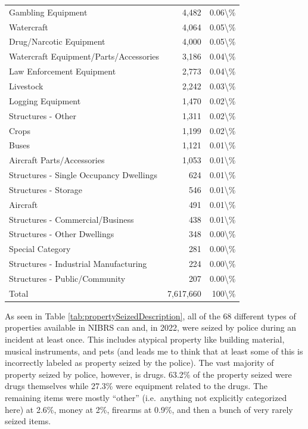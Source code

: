 \documentclass[
  12pt,
  openany]{book}
\begin{document}
\begin{longtable}[t]{lrr}
Gambling Equipment & 4,482 & 0.06\textbackslash{}\%\\
\addlinespace
Watercraft & 4,064 & 0.05\textbackslash{}\%\\
Drug/Narcotic Equipment & 4,000 & 0.05\textbackslash{}\%\\
Watercraft Equipment/Parts/Accessories & 3,186 & 0.04\textbackslash{}\%\\
Law Enforcement Equipment & 2,773 & 0.04\textbackslash{}\%\\
Livestock & 2,242 & 0.03\textbackslash{}\%\\
\addlinespace
Logging Equipment & 1,470 & 0.02\textbackslash{}\%\\
Structures - Other & 1,311 & 0.02\textbackslash{}\%\\
Crops & 1,199 & 0.02\textbackslash{}\%\\
Buses & 1,121 & 0.01\textbackslash{}\%\\
Aircraft Parts/Accessories & 1,053 & 0.01\textbackslash{}\%\\
\addlinespace
Structures - Single Occupancy Dwellings & 624 & 0.01\textbackslash{}\%\\
Structures - Storage & 546 & 0.01\textbackslash{}\%\\
Aircraft & 491 & 0.01\textbackslash{}\%\\
Structures - Commercial/Business & 438 & 0.01\textbackslash{}\%\\
Structures - Other Dwellings & 348 & 0.00\textbackslash{}\%\\
\addlinespace
Special Category & 281 & 0.00\textbackslash{}\%\\
Structures - Industrial Manufacturing & 224 & 0.00\textbackslash{}\%\\
Structures - Public/Community & 207 & 0.00\textbackslash{}\%\\
Total & 7,617,660 & 100\textbackslash{}\%\\
\bottomrule
\end{longtable}

As seen in Table \ref{tab:propertySeizedDescription}, all of the 68 different types of properties available in NIBRS can and, in 2022, were seized by police during an incident at least once. This includes atypical property like building material, musical instruments, and pets (and leads me to think that at least some of this is incorrectly labeled as property seized by the police). The vast majority of property seized by police, however, is drugs. 63.2\% of the property seized were drugs themselves while 27.3\% were equipment related to the drugs. The remaining items were mostly ``other'' (i.e.~anything not explicitly categorized here) at 2.6\%, money at 2\%, firearms at 0.9\%, and then a bunch of very rarely seized items.
\end{document}
